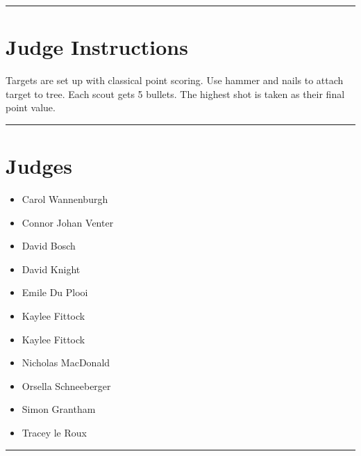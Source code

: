 \documentclass[10pt]{article}
\begin{document}
	\vspace{0.5cm}
	\hrule
	\vspace{0.5cm}

		\section*{Judge Instructions}
		Targets are set up with classical point scoring. Use hammer and nails to attach target to tree. Each scout gets 5 bullets. The highest shot is taken as their final point value.
\vspace{0.5cm}
	\hrule
	\vspace{0.5cm}
		\section*{\faUsers \: Judges}

		

	\begin{multicols}{2}

		\begin{itemize}
									\item Carol Wannenburgh
									\item Connor Johan Venter
									\item David Bosch
									\item David Knight
									\item Emile Du Plooi
									\item Kaylee Fittock
						\end{itemize}

		\vfill\null
		\columnbreak

		\begin{itemize}
									\item Kaylee Fittock
									\item Nicholas MacDonald
									\item Orsella Schneeberger
									\item Simon Grantham
									\item Tracey le Roux
						\end{itemize}

		\vfill\null

		\end{multicols}



			\vspace{0.5cm}
	\hrule
	\vspace{0.5cm}
\end{document}
